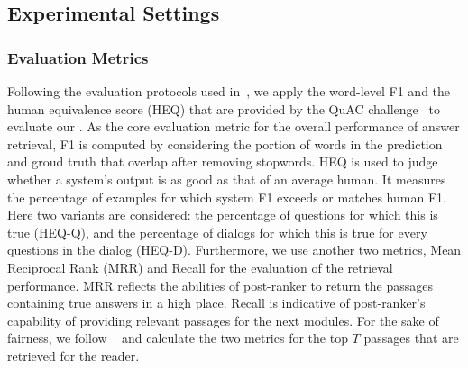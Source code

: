 \vspace{-0.1in}
\subsection{Experimental Settings}

\subsubsection{Evaluation Metrics}
Following the evaluation protocols used in~\cite{qu2020open}, we apply the word-level F1 and the human equivalence score (HEQ) that are provided by the QuAC challenge~\cite{choi2018quac} to evaluate our {\modelname}. As the core evaluation metric for the overall performance of answer retrieval, F1 is computed by considering the portion of words in the prediction and groud truth that overlap after removing stopwords.
HEQ is used to judge whether a system's output is as good as that of an average human. It measures the percentage of examples for which system F1 exceeds or matches human F1. Here two variants are considered: the percentage of questions for which this is true (HEQ-Q), and the percentage of dialogs for which this is true for every questions in the dialog (HEQ-D).
Furthermore, we use another two metrics, Mean Reciprocal Rank (MRR) and Recall for the evaluation of the retrieval performance. MRR reflects the abilities of post-ranker to return the passages containing true answers in a high place.
Recall is indicative of post-ranker's capability of providing relevant passages for the next modules. 
For the sake of fairness, we follow ~\cite{qu2020open} and calculate the two metrics for the top $T$ passages that are retrieved for the reader.



